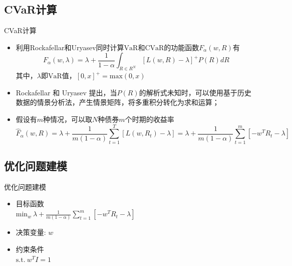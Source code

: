 \documentclass[CJK,aspectratio=169]{beamer}  %
\begin{document}
\subsection{CVaR计算}
\begin{frame}{CVaR计算}
	\begin{itemize}
		\item 利用Rockafellar和Uryasev同时计算$\text{VaR}$和$\text{CVaR}$的功能函数$F_{\alpha}(w,R)$有
		$$
		F_{\alpha}(w,\lambda)=\lambda+\frac{1}{1-\alpha}\int_{R\in R^N}[L(w,R)-\lambda]^{+}P(R)dR
		$$
		其中，$\lambda$即$\text{VaR}$值，$[0,x]^+=\text{max}(0,x)$
		\item Rockafellar 和 Uryasev 提出，当$P(R)$的解析式未知时，可以使用基于历史数据的情景分析法，产生情景矩阵，将多重积分转化为求和运算；
		\item 假设有$m$种情况，可以取$N$种债券$m$个时期的收益率
		$$
		\widehat{F}_{\alpha}(w,R)=\lambda+\frac{1}{m(1-\alpha)}\sum_{t=1}^{T}[L(w,R_t)-\lambda]=\lambda+\frac{1}{m(1-\alpha)}\sum_{t=1}^{m}[-w^TR_t-\lambda]
		$$
	\end{itemize}
\end{frame}

\subsection{优化问题建模}
\begin{frame}{优化问题建模}
	\begin{itemize}
		\item 目标函数 \\
		$
		\text{min}_{w} \ \lambda+\frac{1}{m(1-\alpha)}\sum_{t=1}^{m}[-w^TR_t-\lambda]
		$
		\item 决策变量: $w$
		\item 约束条件 \\
		$
		\text{s.t.} \ w^TI=1
		$
	\end{itemize}
\end{frame}
\end{document}
